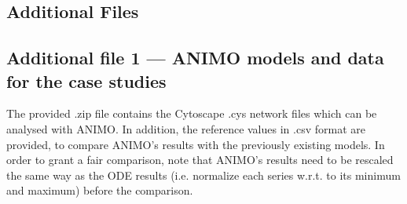 \documentclass{bmcart}
\begin{document}
\begin{backmatter}

\clearpage

\section*{Additional Files}
  \subsection*{Additional file 1 --- ANIMO models and data for the case studies}
      The provided .zip file contains the Cytoscape .cys network files which can be analysed
      with ANIMO. In addition, the reference values in .csv format are provided, to compare
      ANIMO's results with the previously existing models. In order to grant a fair comparison,
      note that ANIMO's results need to be rescaled the same way as the ODE results
      (i.e. normalize each series w.r.t. to its minimum and maximum) before the comparison.


\end{backmatter}
\end{document}
